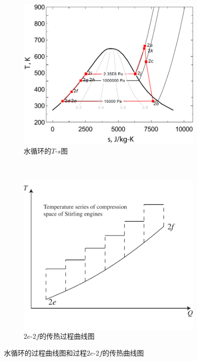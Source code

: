 \begin{figure}[htbp]
\centering
	\begin{subfigure}[b]{0.45\columnwidth}
	\includegraphics[width = \columnwidth]{fig/T-s_Water2}
	\caption{水循环的$T$-$s$图}\label{fig:T-s_Water2}
	\end{subfigure}
	~
\begin{subfigure}[b]{0.45\columnwidth}
	\includegraphics[width = \columnwidth]{fig/HeatTransfer_Water-SEs}
	\caption{$2e$-$2f$的传热过程曲线图}
	\label{fig:HeatTransfer_Water-SEs}
	\end{subfigure}
	
	\caption{水循环的过程曲线图和过程$2e$-$2f$的传热曲线图}\label{fig:Diagrams$2e$-$2f$}
\end{figure}

